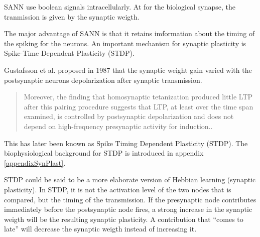 SANN use boolean signals intracellularly. 
At for the biological synapse, the tranmission is given by the synaptic weigth. 

The major advantage of SANN is that it retains imformation about the timing of the spiking for the neurons.  %
An important mechanism for synaptic plasticity is Spike-Time Dependent Plasticity (STDP).

Gustafsson et al. proposed in 1987 that the synaptic weight gain varied with the postsynaptic neurons depolarization after synaptic transmission\cite{Gustafsson03011987}. 
\begin{quote}
Moreover, the finding that homosynaptic tetanization produced little LTP after this pairing procedure suggests that LTP, at least over the time span examined, is controlled by postsynaptic depolarization and does not depend on high-frequency presynaptic activity for induction.\cite{Gustafsson03011987}.
\end{quote}
This has later been known as Spike Timing Dependent Plasticity (STDP)\cite{reviewSTDP}. 
The biophysiological background for STDP is introduced in appendix \ref{appendixSynPlast}.

STDP could be said to be a more elaborate version of Hebbian learning (synaptic plasticity). 
In STDP, it is not the activation level of the two nodes that is compared, but the timing of the transmission.
If the presynaptic node contributes immediately before the postsynaptic node fires, a strong increase in the synaptic weigth will be the resulting synaptic plasticity.
A contribution that ``comes to late'' will decrease the synaptic weigth instead of increasing it\cite{reviewSTDP}.


